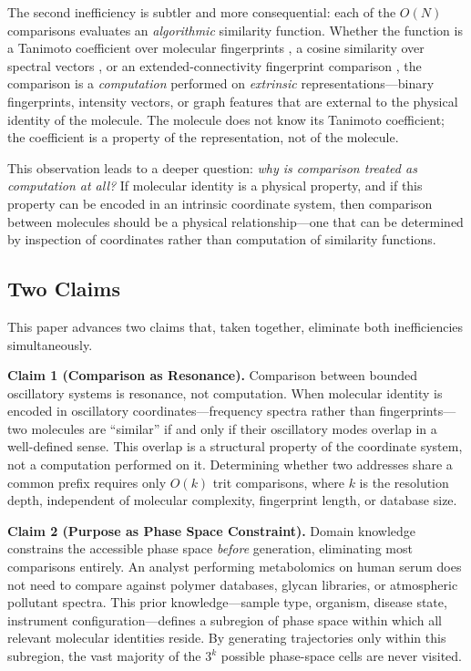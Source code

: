 \documentclass[11pt,twocolumn,a4paper]{article}
\theoremstyle{definition}
\theoremstyle{remark}
\begin{document}
The second inefficiency is subtler and more consequential: each of the $O(N)$ comparisons evaluates an \emph{algorithmic} similarity function. Whether the function is a Tanimoto coefficient over molecular fingerprints \citep{bajusz2015,willett1998}, a cosine similarity over spectral vectors \citep{stein1994}, or an extended-connectivity fingerprint comparison \citep{rogers2010,riniker2013}, the comparison is a \emph{computation} performed on \emph{extrinsic} representations---binary fingerprints, intensity vectors, or graph features that are external to the physical identity of the molecule. The molecule does not know its Tanimoto coefficient; the coefficient is a property of the representation, not of the molecule.

This observation leads to a deeper question: \emph{why is comparison treated as computation at all?} If molecular identity is a physical property, and if this property can be encoded in an intrinsic coordinate system, then comparison between molecules should be a physical relationship---one that can be determined by inspection of coordinates rather than computation of similarity functions.

\subsection{Two Claims}\label{sec:two-claims}

This paper advances two claims that, taken together, eliminate both inefficiencies simultaneously.

\textbf{Claim 1 (Comparison as Resonance).} Comparison between bounded oscillatory systems is resonance, not computation. When molecular identity is encoded in oscillatory coordinates---frequency spectra rather than fingerprints---two molecules are ``similar'' if and only if their oscillatory modes overlap in a well-defined sense. This overlap is a structural property of the coordinate system, not a computation performed on it. Determining whether two addresses share a common prefix requires only $O(k)$ trit comparisons, where $k$ is the resolution depth, independent of molecular complexity, fingerprint length, or database size.

\textbf{Claim 2 (Purpose as Phase Space Constraint).} Domain knowledge constrains the accessible phase space \emph{before} generation, eliminating most comparisons entirely. An analyst performing metabolomics on human serum does not need to compare against polymer databases, glycan libraries, or atmospheric pollutant spectra. This prior knowledge---sample type, organism, disease state, instrument configuration---defines a subregion of phase space within which all relevant molecular identities reside. By generating trajectories only within this subregion, the vast majority of the $3^k$ possible phase-space cells are never visited.
\end{document}
